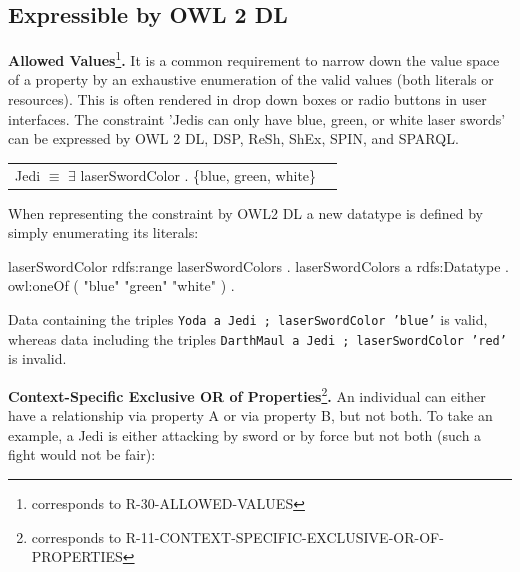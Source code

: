 \documentclass{llncs}
\newcommand{\ms}[1]{\texttt{#1}}
\newenvironment{DL}{
  \scriptsize
  \sffamily
  \vspace{0.3cm}
  \begin{tabular}{r l}

}{
  \end{tabular}
  \linebreak
}
\begin{document}
\subsection{Expressible by OWL 2 DL}
\label{sec:rdf-validation-requirements-without-reasoning-2}

\textbf{Allowed Values}\footnote{corresponds to R-30-ALLOWED-VALUES}\textbf{.}
It is a common requirement to narrow down the value space of a property by an exhaustive enumeration of the valid values (both literals or resources). This is often rendered in drop down boxes or radio buttons in user interfaces. 
The constraint 'Jedis can only have blue, green, or white laser swords' can be expressed by OWL 2 DL, DSP, ReSh, ShEx, SPIN, and SPARQL.
\begin{center}
\begin{DL}
Jedi $\equiv$ $\exists$ laserSwordColor . \{blue, green, white\} \\
\end{DL}
\end{center}
%

When representing the constraint by OWL2 DL a new datatype is defined by simply enumerating its literals:

\begin{ex}
laserSwordColor rdfs:range laserSwordColors . 
laserSwordColors
    a rdfs:Datatype .
    owl:oneOf ( "blue" "green" "white" ) .
\end{ex}

Data containing the triples \ms{Yoda a Jedi ; laserSwordColor 'blue'} is valid, 
whereas data including the triples \ms{DarthMaul a Jedi ; laserSwordColor 'red'} is invalid.

\textbf{Context-Specific Exclusive OR of Properties}\footnote{corresponds to  R-11-CONTEXT-SPECIFIC-EXCLUSIVE-OR-OF-PROPERTIES}\textbf{.}
An individual can either have a relationship via property A or via property B, but not both.
To take an example, a Jedi is either attacking by sword or by force but not both (such a fight would not be fair):
\end{document}
